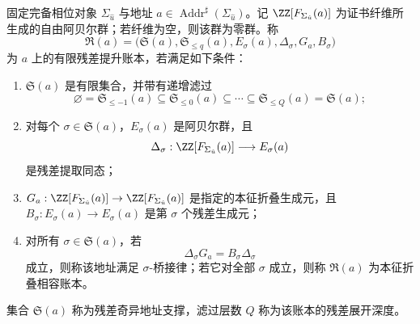 \begin{definition}[证书纤维上的残差提升账本]\label{def:distill-ecalle-certificate-fiber-residual-lift-ledger}
固定完备相位对象 \(\Sigma_{\hat u}\) 与地址
\(a\in\operatorname{Addr}^{\sharp}(\Sigma_{\hat u})\)。记
\(\ZZ[F_{\Sigma_{\hat u}}(a)]\) 为证书纤维所生成的自由阿贝尔群；若纤维为空，则该群为零群。称
\[
\mathfrak R(a)=
\bigl(\mathfrak S(a),\mathfrak S_{\le q}(a),E_\sigma(a),
\Delta_\sigma,G_a,B_\sigma\bigr)
\]
为 \(a\) 上的有限残差提升账本，若满足如下条件：
\begin{enumerate}
  \item \(\mathfrak S(a)\) 是有限集合，并带有递增滤过
  \[
  \varnothing=\mathfrak S_{\le -1}(a)\subseteq \mathfrak S_{\le0}(a)
  \subseteq\cdots\subseteq\mathfrak S_{\le Q}(a)=\mathfrak S(a);
  \]
  \item 对每个 \(\sigma\in\mathfrak S(a)\)，\(E_\sigma(a)\) 是阿贝尔群，且
  \[
  \Delta_\sigma:\ZZ[F_{\Sigma_{\hat u}}(a)]\longrightarrow E_\sigma(a)
  \]
  是残差提取同态；
  \item \(G_a:\ZZ[F_{\Sigma_{\hat u}}(a)]\to\ZZ[F_{\Sigma_{\hat u}}(a)]\) 是指定的本征折叠生成元，且
  \(B_\sigma:E_\sigma(a)\to E_\sigma(a)\) 是第 \(\sigma\) 个残差生成元；
  \item 对所有 \(\sigma\in\mathfrak S(a)\)，若
  \[
  \Delta_\sigma G_a=B_\sigma\Delta_\sigma
  \]
  成立，则称该地址满足 \(\sigma\)-桥接律；若它对全部 \(\sigma\) 成立，则称 \(\mathfrak R(a)\) 为本征折叠相容账本。
\end{enumerate}
集合 \(\mathfrak S(a)\) 称为残差奇异地址支撑，滤过层数 \(Q\) 称为该账本的残差展开深度。
\end{definition}

